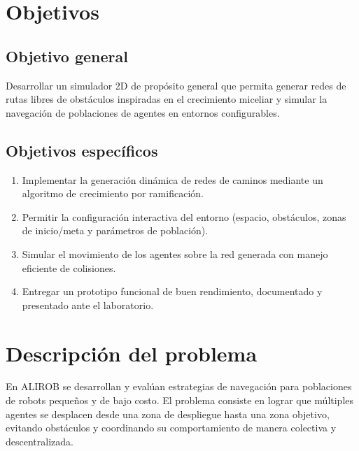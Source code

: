 \documentclass[12pt,a4paper]{article}
\begin{document}

\section{Objetivos}

\subsection{Objetivo general}
Desarrollar un simulador 2D de propósito general que permita generar redes de rutas libres de obstáculos inspiradas en el crecimiento miceliar y simular la navegación de poblaciones de agentes en entornos configurables.

\subsection{Objetivos específicos}
\begin{enumerate}
    \item Implementar la generación dinámica de redes de caminos mediante un algoritmo de crecimiento por ramificación.
    \item Permitir la configuración interactiva del entorno (espacio, obstáculos, zonas de inicio/meta y parámetros de población).
    \item Simular el movimiento de los agentes sobre la red generada con manejo eficiente de colisiones.
    \item Entregar un prototipo funcional de buen rendimiento, documentado y presentado ante el laboratorio.
\end{enumerate}


\section{Descripción del problema}

En ALIROB se desarrollan y evalúan estrategias de navegación para poblaciones de robots pequeños y de bajo costo. El problema consiste en lograr que múltiples agentes se desplacen desde una zona de despliegue hasta una zona objetivo, evitando obstáculos y coordinando su comportamiento de manera colectiva y descentralizada.
\end{document}
